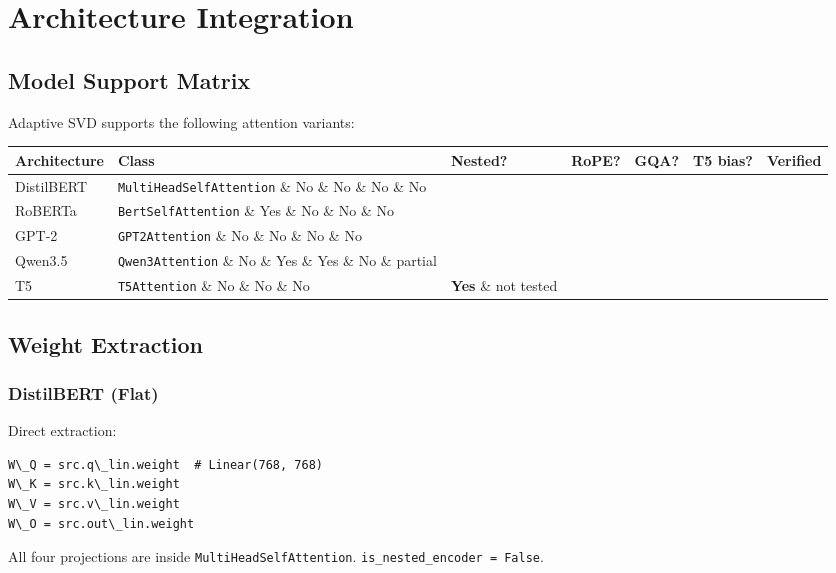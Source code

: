 
\section{Architecture Integration}

\subsection{Model Support Matrix}

Adaptive SVD supports the following attention variants:

\begin{table}[H]
\centering
\small
\begin{tabular}{lllllll}
\toprule
\textbf{Architecture} & \textbf{Class} & \textbf{Nested?} & \textbf{RoPE?} & \textbf{GQA?} & \textbf{T5 bias?} & \textbf{Verified} \\
\midrule
DistilBERT & \texttt{MultiHeadSelfAttention} \& No \& No \& No \& No &  \\
RoBERTa & \texttt{BertSelfAttention} \& Yes \& No \& No \& No &  \\
GPT-2 & \texttt{GPT2Attention} \& No \& No \& No \& No &  \\
Qwen3.5 & \texttt{Qwen3Attention} \& No \& Yes \& Yes \& No \& partial \\
T5 & \texttt{T5Attention} \& No \& No \& No & \textbf{Yes} \& not tested \\
\bottomrule
\end{tabular}
\end{table}

\subsection{Weight Extraction}

\subsubsection{DistilBERT (Flat)}

Direct extraction:

\begin{lstlisting}
W\_Q = src.q\_lin.weight  # Linear(768, 768)
W\_K = src.k\_lin.weight
W\_V = src.v\_lin.weight
W\_O = src.out\_lin.weight
\end{lstlisting}

All four projections are inside \texttt{MultiHeadSelfAttention}. \texttt{is\_nested\_encoder = False}.

